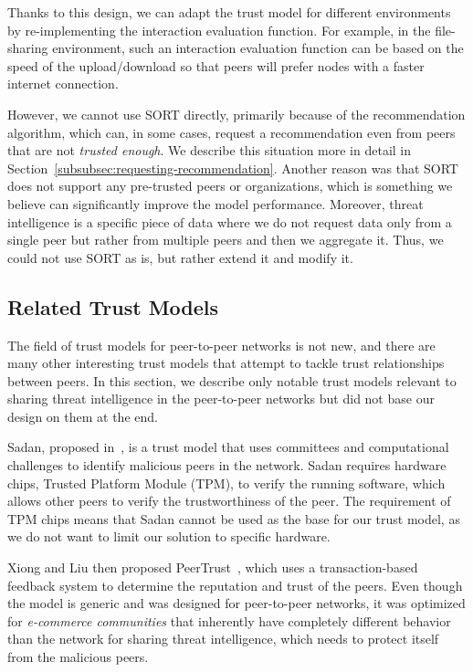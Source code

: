 Thanks to this design, we can adapt the trust model for different environments by re-implementing the interaction evaluation function.
For example, in the file-sharing environment, such an interaction evaluation function can be based on the speed of the upload/download so that peers will prefer nodes with a faster internet connection.

However, we cannot use SORT directly, primarily because of the recommendation algorithm, which can, in some cases, request a recommendation even from peers that are not \textit{trusted enough}. We describe this situation more in detail in Section~\ref{subsubsec:requesting-recommendation}.
Another reason was that SORT does not support any pre-trusted peers or organizations, which is something we believe can significantly improve the model performance.
Moreover, threat intelligence is a specific piece of data where we do not request data only from a single peer but rather from multiple peers and then we aggregate it.
Thus, we could not use SORT as is, but rather extend it and modify it.

\subsection{Related Trust Models}
\label{subsec:related-trust-models}
The field of trust models for peer-to-peer networks is not new, and there are many other interesting trust models that attempt to tackle trust relationships between peers.
In this section, we describe only notable trust models relevant to sharing threat intelligence in the peer-to-peer networks but did not base our design on them at the end.

Sadan, proposed in~\cite{abera2019sadan}, is a trust model that uses committees and computational challenges to identify malicious peers in the network.
Sadan requires hardware chips, Trusted Platform Module (TPM), to verify the running software, which allows other peers to verify the trustworthiness of the peer.
The requirement of TPM chips means that Sadan cannot be used as the base for our trust model, as we do not want to limit our solution to specific hardware.

Xiong and Liu then proposed PeerTrust~\cite{xiong2004peertrust}, which uses a transaction-based feedback system to determine the reputation and trust of the peers.
Even though the model is generic and was designed for peer-to-peer networks, it was optimized for \textit{e-commerce communities} that inherently have completely different behavior than the network for sharing threat intelligence, which needs to protect itself from the malicious peers.

